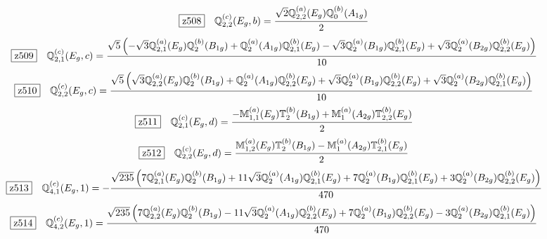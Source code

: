 \documentclass[fleqn,10pt,landscape]{jsarticle}
\begin{document}
\begin{dmath*}
\hspace*{3mm}\fbox{z508}\quad \mathbb{Q}_{2,2}^{(c)}(E_{g},b)=\frac{\sqrt{2} \mathbb{Q}_{2,2}^{(a)}(E_{g}) \mathbb{Q}_{0}^{(b)}(A_{1g})}{2}
\end{dmath*}
\begin{dmath*}
\hspace*{3mm}\fbox{z509}\quad \mathbb{Q}_{2,1}^{(c)}(E_{g},c)=\frac{\sqrt{5} \left(- \sqrt{3} \mathbb{Q}_{2,1}^{(a)}(E_{g}) \mathbb{Q}_{2}^{(b)}(B_{1g}) + \mathbb{Q}_{2}^{(a)}(A_{1g}) \mathbb{Q}_{2,1}^{(b)}(E_{g}) - \sqrt{3} \mathbb{Q}_{2}^{(a)}(B_{1g}) \mathbb{Q}_{2,1}^{(b)}(E_{g}) + \sqrt{3} \mathbb{Q}_{2}^{(a)}(B_{2g}) \mathbb{Q}_{2,2}^{(b)}(E_{g})\right)}{10}
\end{dmath*}
\begin{dmath*}
\hspace*{3mm}\fbox{z510}\quad \mathbb{Q}_{2,2}^{(c)}(E_{g},c)=\frac{\sqrt{5} \left(\sqrt{3} \mathbb{Q}_{2,2}^{(a)}(E_{g}) \mathbb{Q}_{2}^{(b)}(B_{1g}) + \mathbb{Q}_{2}^{(a)}(A_{1g}) \mathbb{Q}_{2,2}^{(b)}(E_{g}) + \sqrt{3} \mathbb{Q}_{2}^{(a)}(B_{1g}) \mathbb{Q}_{2,2}^{(b)}(E_{g}) + \sqrt{3} \mathbb{Q}_{2}^{(a)}(B_{2g}) \mathbb{Q}_{2,1}^{(b)}(E_{g})\right)}{10}
\end{dmath*}
\begin{dmath*}
\hspace*{3mm}\fbox{z511}\quad \mathbb{Q}_{2,1}^{(c)}(E_{g},d)=\frac{- \mathbb{M}_{1,1}^{(a)}(E_{g}) \mathbb{T}_{2}^{(b)}(B_{1g}) + \mathbb{M}_{1}^{(a)}(A_{2g}) \mathbb{T}_{2,2}^{(b)}(E_{g})}{2}
\end{dmath*}
\begin{dmath*}
\hspace*{3mm}\fbox{z512}\quad \mathbb{Q}_{2,2}^{(c)}(E_{g},d)=\frac{\mathbb{M}_{1,2}^{(a)}(E_{g}) \mathbb{T}_{2}^{(b)}(B_{1g}) - \mathbb{M}_{1}^{(a)}(A_{2g}) \mathbb{T}_{2,1}^{(b)}(E_{g})}{2}
\end{dmath*}
\begin{dmath*}
\hspace*{3mm}\fbox{z513}\quad \mathbb{Q}_{4,1}^{(c)}(E_{g},1)=- \frac{\sqrt{235} \left(7 \mathbb{Q}_{2,1}^{(a)}(E_{g}) \mathbb{Q}_{2}^{(b)}(B_{1g}) + 11 \sqrt{3} \mathbb{Q}_{2}^{(a)}(A_{1g}) \mathbb{Q}_{2,1}^{(b)}(E_{g}) + 7 \mathbb{Q}_{2}^{(a)}(B_{1g}) \mathbb{Q}_{2,1}^{(b)}(E_{g}) + 3 \mathbb{Q}_{2}^{(a)}(B_{2g}) \mathbb{Q}_{2,2}^{(b)}(E_{g})\right)}{470}
\end{dmath*}
\begin{dmath*}
\hspace*{3mm}\fbox{z514}\quad \mathbb{Q}_{4,2}^{(c)}(E_{g},1)=\frac{\sqrt{235} \left(7 \mathbb{Q}_{2,2}^{(a)}(E_{g}) \mathbb{Q}_{2}^{(b)}(B_{1g}) - 11 \sqrt{3} \mathbb{Q}_{2}^{(a)}(A_{1g}) \mathbb{Q}_{2,2}^{(b)}(E_{g}) + 7 \mathbb{Q}_{2}^{(a)}(B_{1g}) \mathbb{Q}_{2,2}^{(b)}(E_{g}) - 3 \mathbb{Q}_{2}^{(a)}(B_{2g}) \mathbb{Q}_{2,1}^{(b)}(E_{g})\right)}{470}
\end{dmath*}
\end{document}
